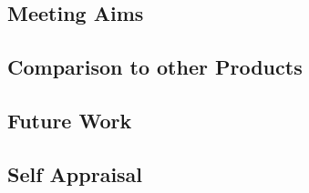 \subsection{Meeting Aims}
\subsection{Comparison to other Products}
\subsection{Future Work}
\subsection{Self Appraisal}